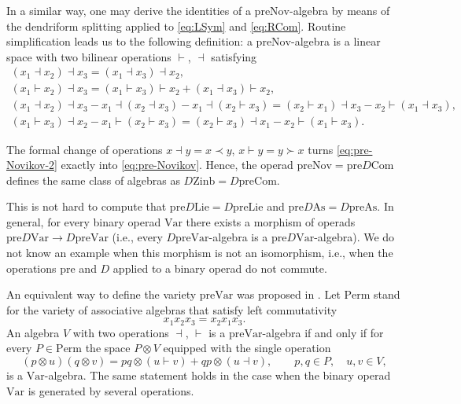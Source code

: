 \documentclass[11pt]{article}
\numberwithin{equation}{section}
\numberwithin{equation}{section}
\def\Var{\mathrm{Var}}
\def\Nov{\mathrm{Nov}}
\def\Com{\mathrm{Com}}
\def\As{\mathrm{As}}
\def\Lie{\mathrm{Lie}}
\def\Perm{\mathrm{Perm}}
\def\Zinb{\mathrm{Zinb}}
\def\pre{\mathrm{pre}}
\begin{document}
In a similar way, one may derive the identities
of a $\pre\Nov$-algebra by means of the dendriform
splitting applied to \eqref{eq:LSym} and \eqref{eq:RCom}.
Routine simplification leads us to the following
definition: a $\pre\Nov$-algebra is a linear space with
two bilinear operations $\vdash $, $\dashv$ satisfying
%
\begin{gather}
 (x_1\dashv x_2)\dashv x_3 = (x_1\dashv x_3)\dashv x_2, \nonumber\\
 (x_1\vdash x_2)\dashv x_3 = (x_1\vdash x_3)\vdash x_2 + (x_1\dashv x_3)\vdash x_2, \nonumber\\
 (x_1\dashv x_2)\dashv x_3 - x_1\dashv (x_2\dashv x_3) - x_1\dashv (x_2\vdash x_3)
 =
 (x_2\vdash x_1)\dashv x_3 - x_2\vdash (x_1\dashv x_3),
 \nonumber\\
 (x_1\vdash x_3)\dashv x_2 - x_1\vdash (x_2\vdash x_3)
 =
 (x_2\vdash x_3)\dashv x_1 - x_2\vdash (x_1\vdash x_3).\label{eq:pre-Novikov-2}
\end{gather}

The formal change of operations $x\dashv y = x\prec y$, $x\vdash y = y\succ x$
turns \eqref{eq:pre-Novikov-2} exactly into \eqref{eq:pre-Novikov}.
Hence, the operad $\pre\Nov = \pre D\Com$ defines
the same class of algebras as $D\Zinb = D\pre\Com $.

\begin{Remark}
This is not hard to compute that
$\pre D\Lie = D\pre\Lie$ and $\pre D\As = D\pre\As$.
In general, for every binary operad $\Var $ there exists
a morphism of operads $\pre D\Var \to D\pre\Var $
(i.e., every $D\pre\Var $-algebra is a $\pre D\Var$-algebra).
We do not know an example when
this morphism is not an isomorphism, i.e., when the
operations $\pre$ and $D$ applied to a binary operad
do not commute.
\end{Remark}

An equivalent way to define the variety
$\pre\Var $ was proposed in \cite{GubKol2014}.
Let $\Perm $ stand for the variety of associative
algebras that satisfy left commutativity
\[
x_1x_2x_3 = x_2x_1x_3.
\]
An algebra $V$ with two operations $\dashv$, $\vdash $
is a $\pre\Var$-algebra if and only if
for every $P\in \Perm $ the space
$P\otimes V$ equipped with the single operation
%
\begin{equation}\label{eq:Dend-Perm}
(p\otimes u)(q\otimes v) = pq\otimes (u\vdash v) +
qp\otimes (u\dashv v),
\qquad
p,q\in P,\quad u,v\in V,
\end{equation}
%
is a $\Var $-algebra.
The same statement holds in the case when the binary operad
$\Var $ is generated by several operations.
\end{document}
